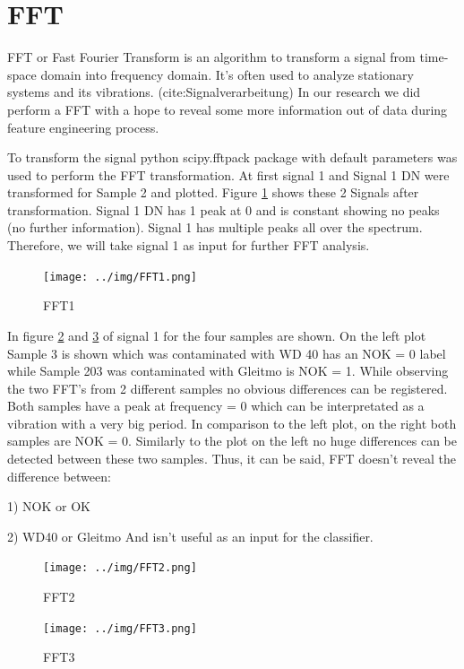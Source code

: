 \documentclass[12pt]{report}
\begin{document}
\section{FFT}
FFT or Fast Fourier Transform is an algorithm to transform a signal from time-space domain into frequency domain. It’s often used to analyze stationary systems and its vibrations. (cite:Signalverarbeitung) In our research we did perform a FFT with a hope to reveal some more information out of data during feature engineering process. 




To transform the signal python scipy.fftpack package with default parameters was used to perform the FFT transformation. At first signal 1 and Signal 1 DN were transformed for Sample 2 and plotted. Figure \ref{fig:FFT1} shows these 2 Signals after transformation. Signal 1 DN has 1 peak at 0 and is constant showing no peaks (no further information). Signal 1 has multiple peaks all over the spectrum. Therefore, we will take signal 1 as input for further FFT analysis.

\begin{figure}[H]
	\centering
	\texttt{[image: ../img/FFT1.png]}
	\caption{FFT1}
	\label{fig:FFT1}
\end{figure}

In figure \ref{fig:FFT2} and \ref{fig:FFT3} of signal 1 for the four samples are shown. On the left plot Sample 3 is shown which was contaminated with WD 40 has an NOK = 0 label while Sample 203 was contaminated with Gleitmo is NOK = 1. While observing the two FFT’s from 2 different samples no obvious differences can be registered. Both samples have a peak at frequency = 0 which can be interpretated as a vibration with a very big period. In comparison to the left plot, on the right both samples are NOK = 0. Similarly to the plot on the left no huge differences can be detected between these two samples. Thus, it can be said, FFT doesn’t reveal the difference between:


1)	NOK or OK


2)	WD40 or Gleitmo\newline
And isn’t useful as an input for the classifier.

\begin{figure}[H]
	\centering
	\texttt{[image: ../img/FFT2.png]}
	\caption{FFT2}
	\label{fig:FFT2}
\end{figure}
\begin{figure}[H]
	\centering
	\texttt{[image: ../img/FFT3.png]}
	\caption{FFT3}
	\label{fig:FFT3}
\end{figure}
\end{document}
